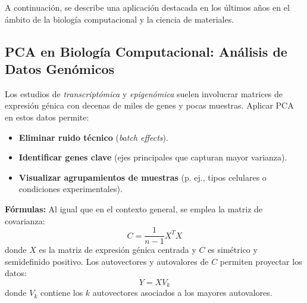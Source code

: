 \documentclass[12pt]{article}
\begin{document}
        \vspace{1em}
        \noindent
        A continuación, se describe una aplicación destacada en los últimos años en el ámbito de la biología computacional y la ciencia de materiales.
        
        \subsection*{PCA en Biología Computacional: Análisis de Datos Genómicos}
        \noindent
        Los estudios de \emph{transcriptómica} y \emph{epigenómica} suelen involucrar matrices de expresión génica con decenas de miles de genes y pocas muestras. Aplicar PCA en estos datos permite:
        \begin{itemize}
                \item \textbf{Eliminar ruido técnico} (\emph{batch effects}).
                \item \textbf{Identificar genes clave} (ejes principales que capturan mayor varianza).
                \item \textbf{Visualizar agrupamientos de muestras} (p. ej., tipos celulares o condiciones experimentales).
        \end{itemize}
        
        \vspace{1em}
        \noindent
        \textbf{Fórmulas:} Al igual que en el contexto general, se emplea la matriz de covarianza:
        \[
        C = \frac{1}{n-1} X^T X
        \]
        donde $ X $ es la matriz de expresión génica centrada y $ C $ es simétrico y semidefinido positivo. Los autovectores y autovalores de $ C $ permiten proyectar los datos:
        \[
        Y = X V_k
        \]
        donde $ V_k $ contiene los $ k $ autovectores asociados a los mayores autovalores.
        
\end{document}
